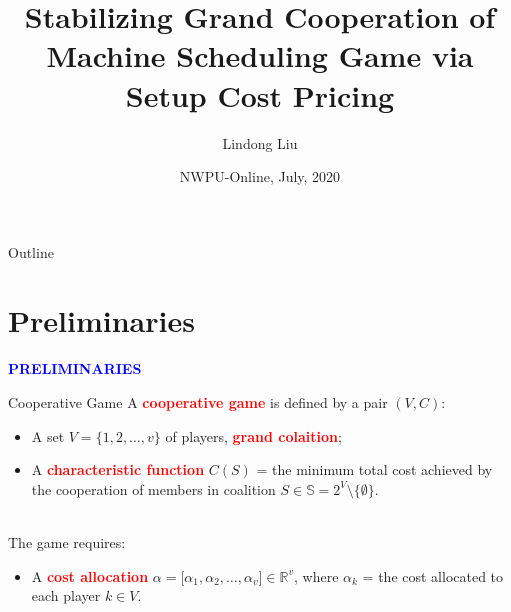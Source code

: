 \documentclass[14pt]{beamer}
\title[Stabilization via Pricing]
{%
	\large
Stabilizing Grand Cooperation of Machine Scheduling Game via Setup Cost Pricing %
}
\author[Lindong Liu] %
{   %
  Lindong Liu
}
\date
{NWPU-Online, July, 2020}
\institute[] %
{\footnotesize
	School of Management; International Institute of Finance\\
	\vspace{2mm}
	University of Science and Technology of China\\
    \vspace{10mm}
	Co-authored with Zikang Li (PG Student, USTC)
	\vspace{6mm}
}
\newcommand{\R}{\mathbb{R}}
\begin{document}
\begin{frame}
  \titlepage
\end{frame}


\begin{frame}{Outline}
\tableofcontents
\end{frame}

\section{Preliminaries}
\begin{frame}
\centering
\large
\textcolor{blue}{\bf {\huge P}RELIMINARIES}
\end{frame}
\begin{frame}{Cooperative Game}
A \textcolor{red}{\bf cooperative game} is defined by a pair $(V,C)$:
\begin{itemize}
\justifying
	\item A set $V = \big\{1,2,\ldots,v\big\}$ of players, \textcolor{red}{\bf grand colaition};
	\item A \textcolor{red}{\bf characteristic function} $C(S)$ = the minimum total cost achieved by the cooperation of members in coalition $S \in \mathbb{S}=2^V \setminus \{\emptyset\}$.
\end{itemize}

~\\The game requires:
\begin{itemize}
\justifying
	\item A \textcolor{red}{\bf cost allocation} $\alpha=\big[\alpha_1,\alpha_2,\ldots,\alpha_v \big] \in \R^v$, where $\alpha_k$ = the cost allocated to each player $k\in V$.
\end{itemize}
\end{frame}
\end{document}
